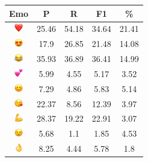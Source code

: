 \documentclass{article}
\begin{document}
\begin{table}
\centering
\begin{tabular}{|c|ccc|c|} \hline
\textbf{Emo} & \textbf{P} & \textbf{R} & \textbf{F1} & \textbf{\%} \\ \hline
\includegraphics[height=0.37cm,width=0.37cm]{img/red_heart.png} & 25.46 & 54.18 & 34.64 & 21.41\\ 
\includegraphics[height=0.37cm,width=0.37cm]{img/smiling_face_with_hearteyes.png} & 17.9 & 26.85 & 21.48 & 14.08\\ 
\includegraphics[height=0.37cm,width=0.37cm]{img/face_with_tears_of_joy.png} & 35.93 & 36.89 & 36.41 & 14.99\\ 
\includegraphics[height=0.37cm,width=0.37cm]{img/two_hearts.png} & 5.99 & 4.55 & 5.17 & 3.52\\ 
\includegraphics[height=0.37cm,width=0.37cm]{img/smiling_face_with_smiling_eyes.png} & 7.29 & 4.86 & 5.83 & 5.14\\ 
\includegraphics[height=0.37cm,width=0.37cm]{img/face_blowing_a_kiss.png} & 22.37 & 8.56 & 12.39 & 3.97\\ 
\includegraphics[height=0.37cm,width=0.37cm]{img/flexed_biceps.png} & 28.37 & 19.22 & 22.91 & 3.07\\ 
\includegraphics[height=0.37cm,width=0.37cm]{img/winking_face.png} & 5.68 & 1.1 & 1.85 & 4.53\\ 
\includegraphics[height=0.37cm,width=0.37cm]{img/OK_hand.png} & 8.25 & 4.44 & 5.78 & 1.8\\ 

\end{tabular}
\end{table}
\end{document}
